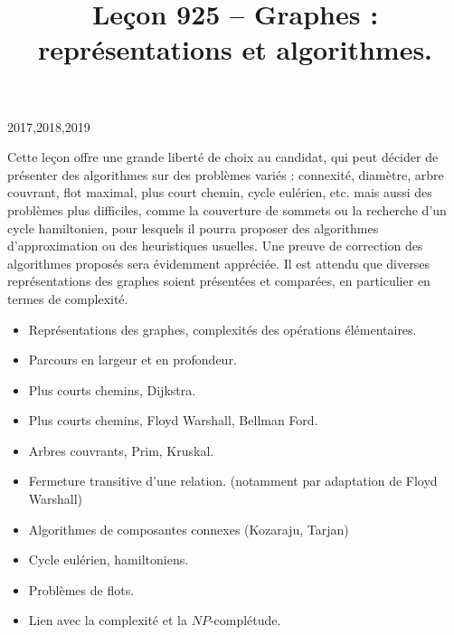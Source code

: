 \documentclass{agregfiche}
\title{Leçon 925 -- Graphes : représentations et algorithmes.}
\begin{document}
\maketitle

\secrapports

\begin{rapport}{2017,2018,2019}

Cette leçon offre une grande liberté de choix au candidat, qui peut décider de présenter des algorithmes sur des problèmes variés : connexité, diamètre, arbre couvrant, flot maximal, plus court chemin, cycle eulérien, etc. mais aussi des problèmes plus difficiles, comme la couverture de sommets ou la recherche d’un cycle hamiltonien, pour lesquels il pourra proposer des algorithmes d’approximation ou des heuristiques usuelles. Une preuve de correction des algorithmes proposés sera évidemment appréciée. Il est attendu que diverses représentations des graphes soient présentées et comparées, en particulier en termes de complexité.

\end{rapport}

\secindispensables

\begin{itemize}
    \item Représentations des graphes, complexités des opérations élémentaires.
    \item Parcours en largeur et en profondeur.
    \item Plus courts chemins, Dijkstra.
\end{itemize}

\secasavoir
\begin{itemize}
    \item Plus courts chemins, Floyd Warshall, Bellman Ford.
    \item Arbres couvrants, Prim, Kruskal.
    \item Fermeture transitive d'une relation. (notamment par adaptation de Floyd Warshall)
    \end{itemize}
\secidees

\begin{itemize}
    \item Algorithmes de composantes connexes (Kozaraju, Tarjan)
    \item Cycle eulérien, hamiltoniens.
    \item Problèmes de flots.
    \item Lien avec la complexité et la $NP$-complétude.
\end{itemize}
\end{document}
